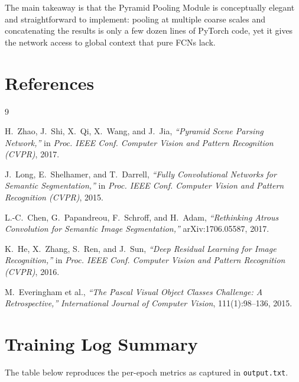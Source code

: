 \documentclass[12pt,a4paper]{article}
\newcommand{\code}[1]{\texttt{#1}}
\begin{document}
The main takeaway is that the Pyramid Pooling Module is conceptually elegant
and straightforward to implement: pooling at multiple coarse scales and
concatenating the results is only a few dozen lines of PyTorch code, yet it
gives the network access to global context that pure FCNs lack.

\section*{References}

\begin{thebibliography}{9}

H.~Zhao, J.~Shi, X.~Qi, X.~Wang, and J.~Jia,
\textit{``Pyramid Scene Parsing Network,''} in
\textit{Proc. IEEE Conf. Computer Vision and Pattern Recognition (CVPR)}, 2017.

J.~Long, E.~Shelhamer, and T.~Darrell,
\textit{``Fully Convolutional Networks for Semantic Segmentation,''} in
\textit{Proc. IEEE Conf. Computer Vision and Pattern Recognition (CVPR)}, 2015.

L.-C.~Chen, G.~Papandreou, F.~Schroff, and H.~Adam,
\textit{``Rethinking Atrous Convolution for Semantic Image Segmentation,''} 
arXiv:1706.05587, 2017.

K.~He, X.~Zhang, S.~Ren, and J.~Sun,
\textit{``Deep Residual Learning for Image Recognition,''} in
\textit{Proc. IEEE Conf. Computer Vision and Pattern Recognition (CVPR)}, 2016.

M.~Everingham et al.,
\textit{``The Pascal Visual Object Classes Challenge: A Retrospective,''}
\textit{International Journal of Computer Vision}, 111(1):98--136, 2015.

\end{thebibliography}

\appendix
\section{Training Log Summary}

The table below reproduces the per-epoch metrics as captured in
\code{output.txt}.
\end{document}
